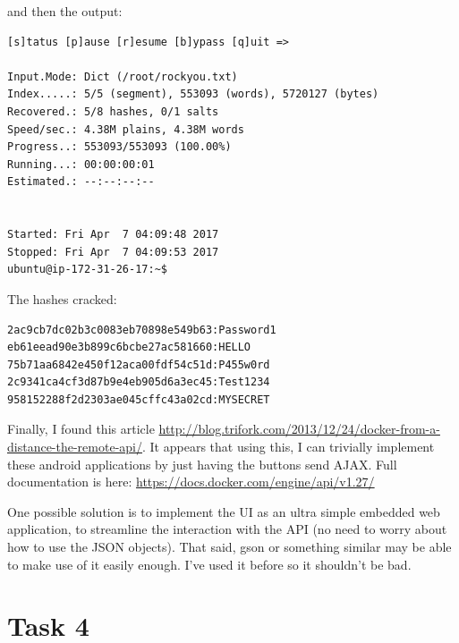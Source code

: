 \documentclass{article}
\begin{document}
and then the output:
\begin{verbatim}
[s]tatus [p]ause [r]esume [b]ypass [q]uit =>

Input.Mode: Dict (/root/rockyou.txt)
Index.....: 5/5 (segment), 553093 (words), 5720127 (bytes)
Recovered.: 5/8 hashes, 0/1 salts
Speed/sec.: 4.38M plains, 4.38M words
Progress..: 553093/553093 (100.00%)
Running...: 00:00:00:01
Estimated.: --:--:--:--


Started: Fri Apr  7 04:09:48 2017
Stopped: Fri Apr  7 04:09:53 2017
ubuntu@ip-172-31-26-17:~$
\end{verbatim}

The hashes cracked:
\begin{verbatim}
2ac9cb7dc02b3c0083eb70898e549b63:Password1
eb61eead90e3b899c6bcbe27ac581660:HELLO
75b71aa6842e450f12aca00fdf54c51d:P455w0rd
2c9341ca4cf3d87b9e4eb905d6a3ec45:Test1234
958152288f2d2303ae045cffc43a02cd:MYSECRET
\end{verbatim}

Finally, I found this article \url{http://blog.trifork.com/2013/12/24/docker-from-a-distance-the-remote-api/}. It appears that using this, I can trivially implement these android applications by just having the buttons send AJAX.
Full documentation is here: \url{https://docs.docker.com/engine/api/v1.27/}

One possible solution is to implement the UI as an ultra simple embedded web application, to streamline the interaction with the API (no need to worry about how to use the JSON objects).
That said, gson or something similar may be able to make use of it easily enough. I've used it before so it shouldn't be bad.

\section{Task 4}
\end{document}
